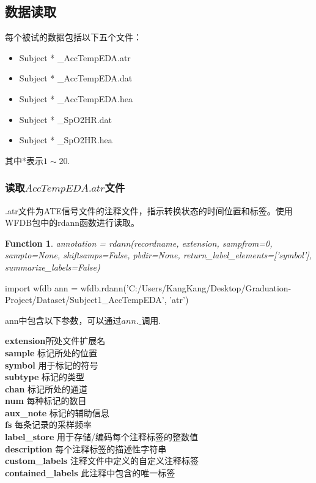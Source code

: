 \documentclass[UTF8]{ctexart}
\begin{document}
\subsection{数据读取}
每个被试的数据包括以下五个文件：
\begin{itemize}
\item Subject * \_AccTempEDA.atr
\item Subject * \_AccTempEDA.dat
\item Subject * \_AccTempEDA.hea
\item Subject * \_SpO2HR.dat
\item Subject * \_SpO2HR.hea
\end{itemize}


其中*表示$1 \sim 20$.
\subsubsection{读取$AccTempEDA.atr$文件}
.atr文件为ATE信号文件的注释文件，指示转换状态的时间位置和标签。使用WFDB包中的rdann函数进行读取。
\newtheorem{thm}{Function}
\begin{thm}
annotation = rdann(recordname, extension, sampfrom=0, sampto=None, shiftsamps=False,
pbdir=None, return\_label\_elements=['symbol'], summarize\_labels=False)
\end{thm}
\begin{python}
import wfdb
ann = wfdb.rdann('C:/Users/KangKang/Desktop/Graduation-Project/Dataset/Subject1_AccTempEDA', 'atr')
\end{python}
ann中包含以下参数，可以通过$ann.\_$调用.
\begin{tabbing}
\textbf{extension}\quad\quad\quad\quad\quad\quad\= 所处文件扩展名\\[5pt]
\textbf{sample}											\> 标记所处的位置\\[5pt]
\textbf{symbol}											\> 用于标记的符号\\[5pt]
\textbf{subtype}										\> 标记的类型\\[5pt]
\textbf{chan}											\> 标记所处的通道\\[5pt]
\textbf{num}												\> 每种标记的数目\\[5pt]
\textbf{aux\_note}										\> 标记的辅助信息\\[5pt]
\textbf{fs}												\> 每条记录的采样频率\\[5pt]
\textbf{label\_store}									\> 用于存储/编码每个注释标签的整数值\\[5pt]
\textbf{description}									\> 每个注释标签的描述性字符串\\[5pt]
\textbf{custom\_labels}								\> 注释文件中定义的自定义注释标签\\[5pt]
\textbf{contained\_labels}							\> 此注释中包含的唯一标签\\
\end{tabbing}
\end{document}
